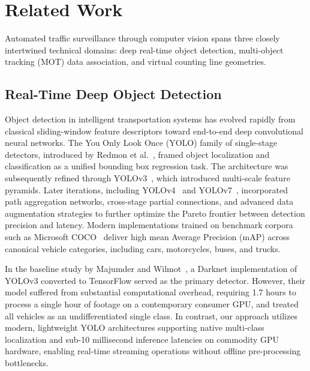 \section{Related Work}
\label{sec:related_work}

Automated traffic surveillance through computer vision spans three closely intertwined technical domains: deep real-time object detection, multi-object tracking (MOT) data association, and virtual counting line geometries.

\subsection{Real-Time Deep Object Detection}
Object detection in intelligent transportation systems has evolved rapidly from classical sliding-window feature descriptors toward end-to-end deep convolutional neural networks. The You Only Look Once (YOLO) family of single-stage detectors, introduced by Redmon et al.~\cite{redmon2016yolo}, framed object localization and classification as a unified bounding box regression task. The architecture was subsequently refined through YOLOv3~\cite{redmon2018yolov3}, which introduced multi-scale feature pyramids. Later iterations, including YOLOv4~\cite{bochkovskiy2020yolov4} and YOLOv7~\cite{wang2023yolov7}, incorporated path aggregation networks, cross-stage partial connections, and advanced data augmentation strategies to further optimize the Pareto frontier between detection precision and latency. Modern implementations trained on benchmark corpora such as Microsoft COCO~\cite{lin2014coco} deliver high mean Average Precision (mAP) across canonical vehicle categories, including cars, motorcycles, buses, and trucks. 

In the baseline study by Majumder and Wilmot~\cite{majumder2023automated}, a Darknet implementation of YOLOv3 converted to TensorFlow served as the primary detector. However, their model suffered from substantial computational overhead, requiring 1.7 hours to process a single hour of footage on a contemporary consumer GPU, and treated all vehicles as an undifferentiated single class. In contrast, our approach utilizes modern, lightweight YOLO architectures supporting native multi-class localization and sub-10 millisecond inference latencies on commodity GPU hardware, enabling real-time streaming operations without offline pre-processing bottlenecks.

